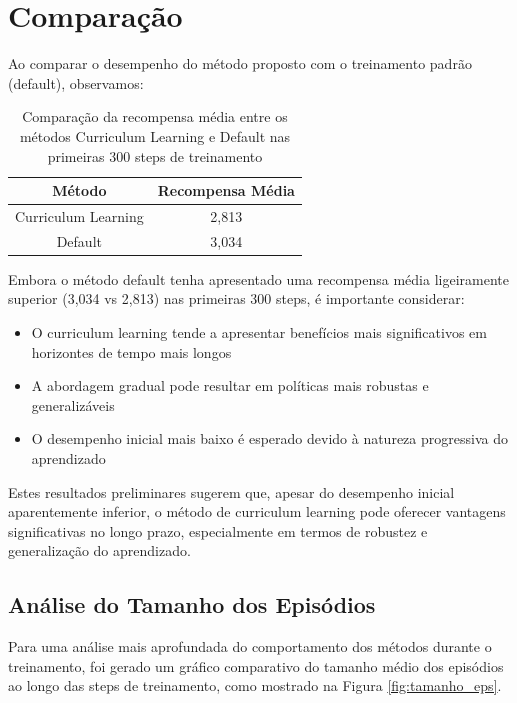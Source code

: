\section{Comparação}

Ao comparar o desempenho do método proposto com o treinamento padrão (default), observamos:

\begin{table}[H]
    \centering
    \begin{tabular}{|c|c|}
        \hline
        \textbf{Método} & \textbf{Recompensa Média} \\
        \hline
        Curriculum Learning & 2,813 \\
        Default & 3,034 \\
        \hline
    \end{tabular}
    \caption{Comparação da recompensa média entre os métodos Curriculum Learning e Default nas primeiras 300 steps de treinamento}
    \label{tab:cl_vs_default}
\end{table}

Embora o método default tenha apresentado uma recompensa média ligeiramente superior (3,034 vs 2,813) nas primeiras 300 steps, é importante considerar:

\begin{itemize}
    \item O curriculum learning tende a apresentar benefícios mais significativos em horizontes de tempo mais longos
    
    \item A abordagem gradual pode resultar em políticas mais robustas e generalizáveis
    
    \item O desempenho inicial mais baixo é esperado devido à natureza progressiva do aprendizado
\end{itemize}

Estes resultados preliminares sugerem que, apesar do desempenho inicial aparentemente inferior, o método de curriculum learning pode oferecer vantagens significativas no longo prazo, especialmente em termos de robustez e generalização do aprendizado.

\subsection{Análise do Tamanho dos Episódios}

Para uma análise mais aprofundada do comportamento dos métodos durante o treinamento, foi gerado um gráfico comparativo do tamanho médio dos episódios ao longo das steps de treinamento, como mostrado na Figura \ref{fig:tamanho_eps}.

